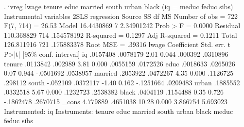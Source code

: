 . ivreg lwage tenure educ married south urban black (iq = meduc feduc sibs)
{\smallskip}
Instrumental variables 2SLS regression
{\smallskip}
      Source {\VBAR}       SS           df       MS      Number of obs   =       722
   F(7, 714)       =     26.53
       Model {\VBAR}  16.4430869         7  2.34901242   Prob > F        =    0.0000
    Residual {\VBAR}  110.368829       714  .154578192   R-squared       =    0.1297
   Adj R-squared   =    0.1211
       Total {\VBAR}  126.811916       721  .175883378   Root MSE        =    .39316
{\smallskip}
       lwage {\VBAR} Coefficient  Std. err.      t    P>|t|     [95\% conf. interval]
          iq {\VBAR}   .0157408   .0078179     2.01   0.044      .000392    .0310896
      tenure {\VBAR}   .0113842    .002989     3.81   0.000     .0055159    .0172526
        educ {\VBAR}   .0018633   .0265026     0.07   0.944    -.0501692    .0538957
     married {\VBAR}   .2053922   .0472267     4.35   0.000     .1126725     .298112
       south {\VBAR}   -.052109   .0372117    -1.40   0.162    -.1251664    .0209483
       urban {\VBAR}   .1885552   .0332518     5.67   0.000     .1232723    .2538382
       black {\VBAR}   .0404119   .1154488     0.35   0.726    -.1862478    .2670715
       _cons {\VBAR}   4.779889   .4651038    10.28   0.000     3.866754    5.693023
Instrumented: iq
 Instruments: tenure educ married south urban black meduc feduc sibs
{\smallskip}

